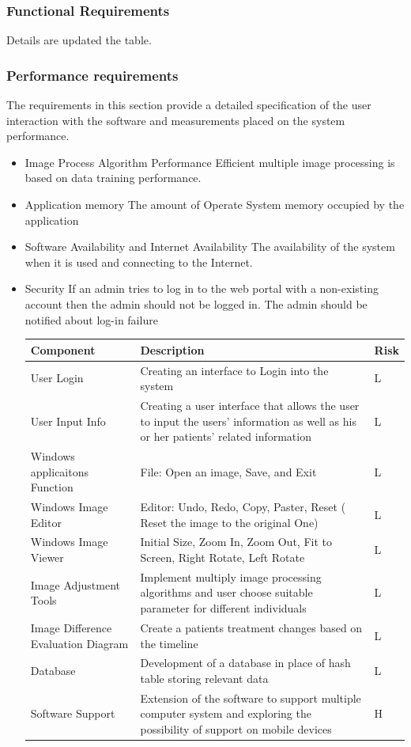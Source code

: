 \subsubsection{Functional Requirements}
Details are updated the table.
\subsubsection{Performance requirements}
The requirements in this section provide a detailed specification of the user interaction with the software and measurements placed on the system performance. 
\begin{itemize}
\item{Image Process Algorithm Performance}
Efficient multiple image processing is based on data training performance.
\item{Application memory} 
 The amount of Operate System memory occupied by the application
\item{Software Availability and Internet Availability}  The availability of the system when it is used and connecting to the Internet.
\item{Security} If an admin tries to log in to the web portal with a non-existing account then the admin should not be logged in. The admin should be notified about log-in failure
\begin{center}
 \label{tab:title2} 
\begin{tabular}{ | m{4.5cm}| m{9cm} | m{1cm} |} 
\hline
Component & Description & Risk\\ 
\hline
User Login & Creating an interface to Login into the system & L \\ 
\hline
User Input Info & Creating a user interface that allows the user to input the
users' information as well as his or her patients' related information& L \\ 
\hline
Windows applicaitons Function & File: Open an image, Save, and Exit & L \\
\hline
Windows Image Editor & Editor: Undo, Redo, Copy, Paster, Reset ( Reset the image to the original One) & L \\
\hline
Windows Image Viewer & Initial Size, Zoom In, Zoom Out, Fit to Screen, Right Rotate, Left Rotate & L \\
\hline
Image Adjustment Tools & Implement multiply image processing algorithms and user choose suitable parameter for different individuals & L \\
\hline
Image Difference Evaluation Diagram & Create a patients treatment changes based on the timeline & L \\
\hline
Database & Development of a database in place of hash table storing relevant
data & L \\
\hline
Software Support & Extension of the software to support multiple computer system and exploring the possibility of support on mobile devices & H \\
\hline
\end{tabular}
\end{center}


\end{itemize}
